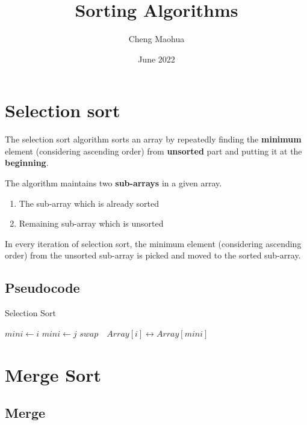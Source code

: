 \documentclass{article}
\title{Sorting Algorithms}
\author{Cheng Maohua}
\date{June 2022}
\begin{document}
\maketitle

\section{Selection sort}

The selection sort algorithm sorts an array by repeatedly finding the \textbf{minimum} element (considering ascending order) from \textbf{unsorted} part and putting it at the \textbf{beginning}.

The algorithm maintains two \textbf{sub-arrays} in a given array.
\begin{enumerate}
    \item The sub-array which is already sorted
    \item Remaining sub-array which is unsorted
\end{enumerate}

In every iteration of selection sort, the minimum element (considering ascending order) from the unsorted sub-array is picked and moved to the sorted sub-array.

\subsection{Pseudocode}

\begin{algorithm}
    \caption{Selection Sort}
    \begin{algorithmic}[1]
        \State $mini\gets i$   
          
        \State $mini \gets j$
        \EndIf
        \EndFor
        \State $swap \quad Array[i]\leftrightarrow Array[mini]$ 
        \EndIf
        \EndFor
        \EndFunction
    \end{algorithmic}
\end{algorithm}

\section{Merge Sort}

\subsection{Merge}
\end{document}
